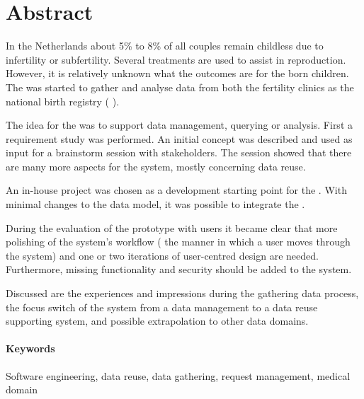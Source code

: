 \clearpage
{}
{}

\section*{Abstract}

In the Netherlands about 5\% to 8\% of all couples remain childless due to infertility or subfertility.
Several treatments are used to assist in reproduction.
However, it is relatively unknown what the outcomes are for the born children.
The \project{} was started to gather and analyse data from both the fertility clinics as the national birth registry (\ie{} \PRN{}).

The idea for the \ivfsystem{} was to support data management, \eg{} querying or analysis.
First a requirement study was performed. 
An initial concept was described and used as input for a brainstorm session with stakeholders.
The session showed that there are many more aspects for the system, mostly concerning data reuse.

An in-house project was chosen as a development starting point for the \ivfsystem{}.
With minimal changes to the data model, it was possible to integrate the \projectdata{}.

During the evaluation of the prototype with users it became clear that more polishing of the system's workflow (\ie{} the manner in which a user moves through the system) and one or two iterations of user-centred design are needed.
Furthermore, missing functionality and security should be added to the system.

Discussed are the experiences and impressions during the gathering data process, the focus switch of the system from a data management to a data reuse supporting system, and possible extrapolation to other data domains.

\paragraph{Keywords}
Software engineering, data reuse, data gathering, request management, medical domain